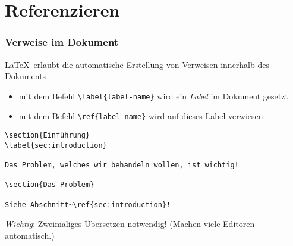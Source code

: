
\subtitle{Nummerierung, Referenzierung, Bibliographie}
\date{2017-05-16}



\section{Referenzieren}

\begin{frame}[fragile]
  \frametitle{Verweise im Dokument}

  \onslide<+->

  \LaTeX\ erlaubt die automatische Erstellung von Verweisen innerhalb des Dokuments

  \begin{itemize}
  \item<+-> mit dem Befehl \lstinline!\label{label-name}! wird ein \emph{Label} im Dokument
    gesetzt
  \item<+-> mit dem Befehl \lstinline!\ref{label-name}! wird auf dieses Label verwiesen
  \end{itemize}

  \onslide<+->

\begin{lstlisting}
\section{Einführung}
\label{sec:introduction}

Das Problem, welches wir behandeln wollen, ist wichtig!

\section{Das Problem}

Siehe Abschnitt~\ref{sec:introduction}!
\end{lstlisting}

  \onslide<+->

  \emph{Wichtig}: Zweimaliges Übersetzen notwendig! (Machen viele Editoren automatisch.)

\end{frame}

